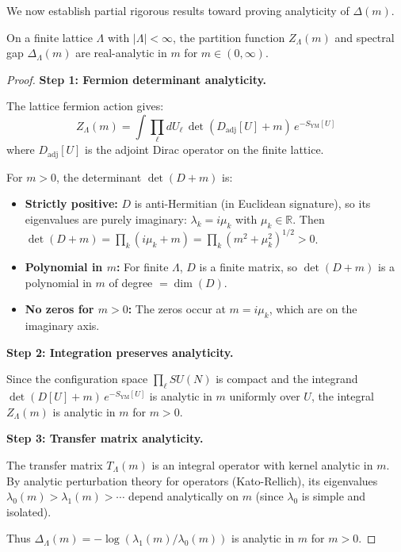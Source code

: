 We now establish partial rigorous results toward proving analyticity of $\Delta(m)$.

\begin{theorem}
\label{thm:finite-vol-analytic-m}
On a finite lattice $\Lambda$ with $|\Lambda| < \infty$, the partition function 
$Z_\Lambda(m)$ and spectral gap $\Delta_\Lambda(m)$ are real-analytic in $m$ 
for $m \in (0, \infty)$.
\end{theorem}

\begin{proof}
\textbf{Step 1: Fermion determinant analyticity.}

The lattice fermion action gives:
\[
Z_\Lambda(m) = \int \prod_{\ell} dU_\ell \, \det(D_{\text{adj}}[U] + m) \, e^{-S_{\text{YM}}[U]}
\]
where $D_{\text{adj}}[U]$ is the adjoint Dirac operator on the finite lattice.

For $m > 0$, the determinant $\det(D + m)$ is:
\begin{itemize}
\item \textbf{Strictly positive:} $D$ is anti-Hermitian (in Euclidean signature), 
so its eigenvalues are purely imaginary: $\lambda_k = i\mu_k$ with $\mu_k \in \mathbb{R}$.
Then $\det(D + m) = \prod_k (i\mu_k + m) = \prod_k (m^2 + \mu_k^2)^{1/2} > 0$.
\item \textbf{Polynomial in $m$:} For finite $\Lambda$, $D$ is a finite matrix, 
so $\det(D + m)$ is a polynomial in $m$ of degree $= \dim(D)$.
\item \textbf{No zeros for $m > 0$:} The zeros occur at $m = i\mu_k$, which are 
on the imaginary axis.
\end{itemize}

\textbf{Step 2: Integration preserves analyticity.}

Since the configuration space $\prod_\ell SU(N)$ is compact and the integrand 
$\det(D[U] + m) \, e^{-S_{\text{YM}}[U]}$ is analytic in $m$ uniformly over $U$, 
the integral $Z_\Lambda(m)$ is analytic in $m$ for $m > 0$.

\textbf{Step 3: Transfer matrix analyticity.}

The transfer matrix $T_\Lambda(m)$ is an integral operator with kernel analytic in $m$.
By analytic perturbation theory for operators (Kato-Rellich), its eigenvalues 
$\lambda_0(m) > \lambda_1(m) > \cdots$ depend analytically on $m$ (since $\lambda_0$ 
is simple and isolated).

Thus $\Delta_\Lambda(m) = -\log(\lambda_1(m)/\lambda_0(m))$ is analytic in $m$ for $m > 0$.
\end{proof}

